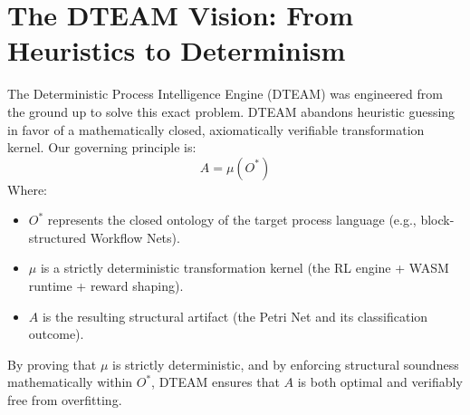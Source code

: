 \section{The DTEAM Vision: From Heuristics to Determinism}
The Deterministic Process Intelligence Engine (DTEAM) was engineered from the ground up to solve this exact problem. DTEAM abandons heuristic guessing in favor of a mathematically closed, axiomatically verifiable transformation kernel. Our governing principle is:
\begin{equation}
A = \mu(O^*)
\end{equation}
Where:
\begin{itemize}
    \item $O^*$ represents the closed ontology of the target process language (e.g., block-structured Workflow Nets).
    \item $\mu$ is a strictly deterministic transformation kernel (the RL engine + WASM runtime + reward shaping).
    \item $A$ is the resulting structural artifact (the Petri Net and its classification outcome).
\end{itemize}

By proving that $\mu$ is strictly deterministic, and by enforcing structural soundness mathematically within $O^*$, DTEAM ensures that $A$ is both optimal and verifiably free from overfitting.
